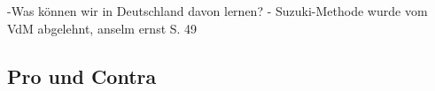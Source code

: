 









-Was können wir in Deutschland davon lernen? - Suzuki-Methode wurde vom VdM
abgelehnt, anselm ernst S. 49



\subsection{Pro und Contra}
